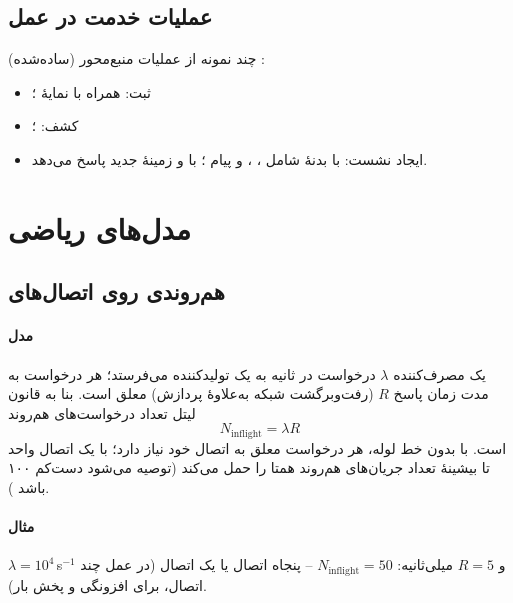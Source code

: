 \documentclass[11pt,a4paper]{article}
\begin{document}
\subsection{عملیات خدمت در عمل}
چند نمونه از عملیات منبع‌محور (ساده‌شده) \cite{ts29510}:
\begin{itemize}
  \item ثبت:  همراه با نمایهٔ ؛
  \item کشف: ؛
  \item ایجاد نشست:  با بدنهٔ  شامل ،
        ،  و پیام ؛  با  و  زمینهٔ  جدید پاسخ می‌دهد.
\end{itemize}

\section{مدل‌های ریاضی}

\subsection{هم‌روندی روی اتصال‌های }\label{sec:inflight}
\paragraph{مدل} یک مصرف‌کننده $\lambda$ درخواست در ثانیه به یک تولیدکننده می‌فرستد؛ هر درخواست به مدت زمان پاسخ $R$ (رفت‌وبرگشت
شبکه به‌علاوهٔ پردازش) معلق است. بنا به قانون لیتل تعداد درخواست‌های هم‌روند
\begin{equation}\label{eq:inflight}
  N_{\mathrm{inflight}} = \lambda R
\end{equation}
است. با  بدون خط لوله، هر درخواست معلق به اتصال خود نیاز دارد؛ با  یک اتصال واحد تا بیشینهٔ تعداد
جریان‌های هم‌روند همتا را حمل می‌کند (توصیه می‌شود دست‌کم ۱۰۰ باشد \cite{rfc9113}).
\paragraph{مثال} $\lambda = 10^4$\,s$^{-1}$ و $R = 5$ میلی‌ثانیه: $N_{\mathrm{inflight}} = 50$ -- پنجاه اتصال  یا یک
اتصال  (در عمل چند اتصال، برای افزونگی و پخش بار).
\end{document}
